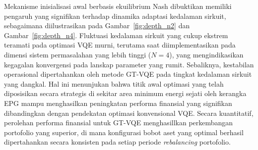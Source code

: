 \begin{table}[t!]
  \centering
  \caption{Ringkasan Performa Simulasi Finansial ($N=2$ dan $N=4$)}
  \label{tab:performa}
\end{table}

Mekanisme inisialisasi awal berbasis ekuilibrium Nash dibuktikan memiliki pengaruh yang signifikan terhadap dinamika adaptasi kedalaman sirkuit, sebagaimana diilustrasikan pada Gambar~\ref{fig:depth_n2} dan Gambar~\ref{fig:depth_n4}. Fluktuasi kedalaman sirkuit yang cukup ekstrem teramati pada optimasi VQE murni, terutama saat diimplementasikan pada dimensi sistem permasalahan yang lebih tinggi ($N=4$), yang mengindikasikan kegagalan konvergensi pada lanskap parameter yang rumit. Sebaliknya, kestabilan operasional dipertahankan oleh metode GT-VQE pada tingkat kedalaman sirkuit yang dangkal. Hal ini menunjukan bahwa titik awal optimasi yang telah diposisikan secara strategis di sekitar area minimum energi sejati oleh kerangka EPG mampu menghasilkan peningkatan performa finansial yang signifikan dibandingkan dengan pendekatan optimasi konvensional VQE. Secara kuantitatif, perolehan performa finansial untuk GT-VQE menghasillkan perkembangan portofolio yang superior, di mana konfigurasi bobot aset yang optimal berhasil dipertahankan secara konsisten pada setiap periode \textit{rebalancing} portofolio.
